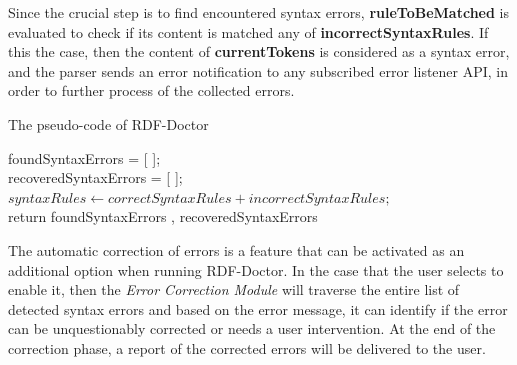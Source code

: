 Since the crucial step is to find encountered syntax errors, \textbf{ruleToBeMatched} is evaluated to check if its content is matched any of \textbf{incorrectSyntaxRules}. If this the case, then the content of \textbf{currentTokens} is considered as a syntax error, and the parser sends an error notification to any subscribed error listener API, in order to further process of the collected errors. 

\begin{algorithm}[] 
 \caption{The pseudo-code of RDF-Doctor}
 \label{alg:algorithm-main}
foundSyntaxErrors = [ ];\\
recoveredSyntaxErrors = [ ];\\
$syntaxRules \leftarrow correctSyntaxRules + incorrectSyntaxRules;$\\
return foundSyntaxErrors , recoveredSyntaxErrors
\end{algorithm}

The automatic correction of errors is a feature that can be activated as an additional option when running RDF-Doctor. 
In the case that the user selects to enable it, then the \emph{Error Correction Module} will traverse the entire list of detected syntax errors and based on the error message, it can identify if the error can be unquestionably corrected or needs a user intervention. 
At the end of the correction phase, a report of the corrected errors will be delivered to the user. 

